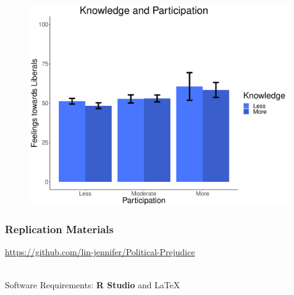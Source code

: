 \documentclass[14pt]{beamer}
\newcommand\tb{\textbf}
\begin{document}
\begin{frame}
\begin{center}
\begin{figure}[ht!]  
	{	 \includegraphics[width=\textwidth]{KPLib}}
\end{figure}
\end{center}
\end{frame}




\begin{frame}
\frametitle{Replication Materials}
\begin{center}
	\url{https://github.com/lin-jennifer/Political-Prejudice}
	
~~\\
Software Requirements: \tb{R Studio} and \LaTeX

\end{center}
\end{frame}
\end{document}
